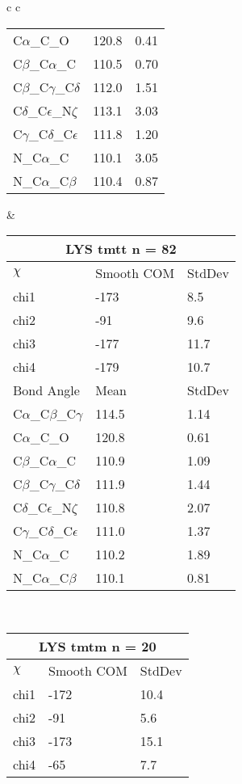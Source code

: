 \begin{longtable}{ c c }
\begin{tabular}{ l l l }
  C$\alpha$\_C\_O & 120.8 & 0.41\\
  C$\beta$\_C$\alpha$\_C & 110.5 & 0.70\\
  C$\beta$\_C$\gamma$\_C$\delta$ & 112.0 & 1.51\\
  C$\delta$\_C$\epsilon$\_N$\zeta$ & 113.1 & 3.03\\
  C$\gamma$\_C$\delta$\_C$\epsilon$ & 111.8 & 1.20\\
  N\_C$\alpha$\_C & 110.1 & 3.05\\
  N\_C$\alpha$\_C$\beta$ & 110.4 & 0.87\\
  \bottomrule
  \end{tabular}
  &
  \begin{tabular}{ l l l }
  \toprule
  \multicolumn{3}{c}{LYS \textbf{tmtt} n = 82} \\ \toprule
  $\chi$       & Smooth COM & StdDev \\ \midrule
  chi1 & -173 & 8.5 \\ 
  chi2 & -91 & 9.6 \\ 
  chi3 & -177 & 11.7 \\ 
  chi4 & -179 & 10.7 \\ \midrule
  Bond Angle   & Mean     & StdDev \\ \midrule
  C$\alpha$\_C$\beta$\_C$\gamma$ & 114.5 & 1.14\\
  C$\alpha$\_C\_O & 120.8 & 0.61\\
  C$\beta$\_C$\alpha$\_C & 110.9 & 1.09\\
  C$\beta$\_C$\gamma$\_C$\delta$ & 111.9 & 1.44\\
  C$\delta$\_C$\epsilon$\_N$\zeta$ & 110.8 & 2.07\\
  C$\gamma$\_C$\delta$\_C$\epsilon$ & 111.0 & 1.37\\
  N\_C$\alpha$\_C & 110.2 & 1.89\\
  N\_C$\alpha$\_C$\beta$ & 110.1 & 0.81\\
  \bottomrule
  \end{tabular}
  \\
  \begin{tabular}{ l l l }
  \toprule
  \multicolumn{3}{c}{LYS \textbf{tmtm} n = 20} \\ \toprule
  $\chi$       & Smooth COM & StdDev \\ \midrule
  chi1 & -172 & 10.4 \\ 
  chi2 & -91 & 5.6 \\ 
  chi3 & -173 & 15.1 \\ 
  chi4 & -65 & 7.7 \\ \midrule

\end{tabular}
\end{longtable}
